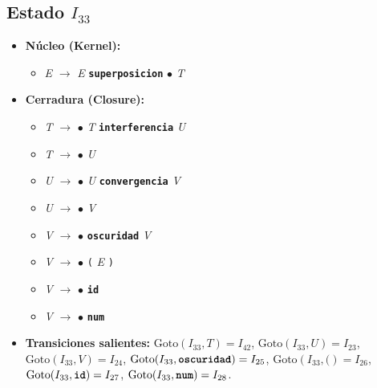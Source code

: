 \documentclass[12pt, letterpaper]{article}
\begin{document}
\subsection*{Estado $I_{33}$ }
\begin{itemize}\setlength{\itemsep}{1pt}\setlength{\parskip}{0pt}
\item \textbf{Núcleo (Kernel):}
\begin{itemize}\setlength{\itemsep}{1pt}\setlength{\parskip}{0pt}
    \item \textit{E} $\to$ \textit{E} \textbf{\texttt{superposicion}} $\bullet$ \textit{T}
\end{itemize}
\item \textbf{Cerradura (Closure):}
\begin{itemize}\setlength{\itemsep}{1pt}\setlength{\parskip}{0pt}
    \item \textit{T} $\to$ $\bullet$ \textit{T} \textbf{\texttt{interferencia}} \textit{U}
    \item \textit{T} $\to$ $\bullet$ \textit{U}
    \item \textit{U} $\to$ $\bullet$ \textit{U} \textbf{\texttt{convergencia}} \textit{V}
    \item \textit{U} $\to$ $\bullet$ \textit{V}
    \item \textit{V} $\to$ $\bullet$ \textbf{\texttt{oscuridad}} \textit{V}
    \item \textit{V} $\to$ $\bullet$ \texttt{(} \textit{E} \texttt{)}
    \item \textit{V} $\to$ $\bullet$ \textbf{\texttt{id}}
    \item \textit{V} $\to$ $\bullet$ \textbf{\texttt{num}}
\end{itemize}
\item \textbf{Transiciones salientes:} $\text{Goto}(I_{33}, \textit{T}) = I_{42}$, \quad $\text{Goto}(I_{33}, \textit{U}) = I_{23}$, \quad $\text{Goto}(I_{33}, \textit{V}) = I_{24}$, \quad $\text{Goto}(I_{33}, \textbf{\texttt{oscuridad}}) = I_{25}$, \quad $\text{Goto}(I_{33}, \texttt{(}) = I_{26}$, \quad $\text{Goto}(I_{33}, \textbf{\texttt{id}}) = I_{27}$, \quad $\text{Goto}(I_{33}, \textbf{\texttt{num}}) = I_{28}$.
\end{itemize}
\vspace{2pt}
\end{document}
